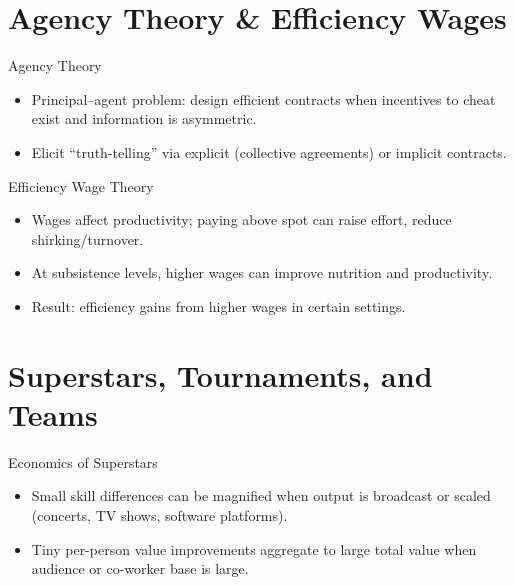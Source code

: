 \documentclass[aspectratio=169]{beamer}
\begin{document}
\section{Agency Theory \& Efficiency Wages}

\begin{frame}{Agency Theory}
\transfade
\begin{itemize}[<+->]
  \item Principal--agent problem: design efficient contracts when incentives to cheat exist and information is asymmetric.
  \item Elicit ``truth-telling'' via explicit (collective agreements) or implicit contracts.
\end{itemize}
\end{frame}

\begin{frame}{Efficiency Wage Theory}
\transfade
\begin{itemize}[<+->]
  \item Wages affect productivity; paying above spot can raise effort, reduce shirking/turnover.
  \item At subsistence levels, higher wages can improve nutrition and productivity.
  \item Result: \alert{efficiency gains} from higher wages in certain settings.
\end{itemize}
\end{frame}

\section{Superstars, Tournaments, and Teams}

\begin{frame}{Economics of Superstars}
\transfade
\begin{itemize}[<+->]
  \item Small skill differences can be magnified when output is broadcast or scaled (concerts, TV shows, software platforms).
  \item Tiny per-person value improvements aggregate to large total value when audience or co-worker base is large.
\end{itemize}
\end{frame}
\end{document}
